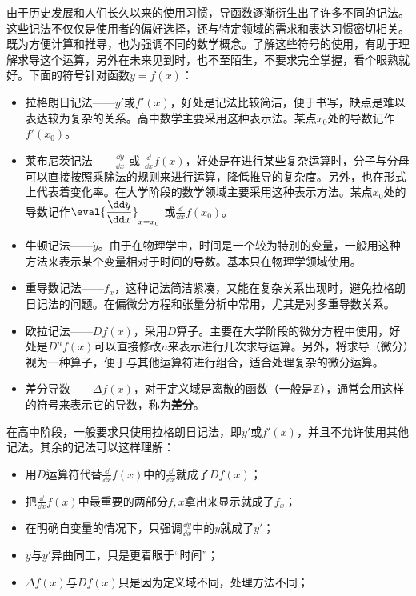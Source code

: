 由于历史发展和人们长久以来的使用习惯，导函数逐渐衍生出了许多不同的记法。这些记法不仅仅是使用者的偏好选择，还与特定领域的需求和表达习惯密切相关。既为方便计算和推导，也为强调不同的数学概念。了解这些符号的使用，有助于理解求导这个运算，另外在未来见到时，也不至陌生，不要求完全掌握，看个眼熟就好。下面的符号针对函数$y=f(x)$：
\begin{itemize}
\item 拉格朗日记法——$y'$或$f'(x)$，好处是记法比较简洁，便于书写，缺点是难以表达较为复杂的关系。高中数学主要采用这种表示法。某点$x_0$处的导数记作$f'(x_0)$。
\item 莱布尼茨记法——$\displaystyle\frac{\dd y}{\dd x}$  或  $\displaystyle\frac{\dd}{\dd x}f(x)$，好处是在进行某些复杂运算时，分子与分母可以直接按照乘除法的规则来进行运算，降低推导的复杂度。另外，也在形式上代表着变化率。在大学阶段的数学领域主要采用这种表示方法。某点$x_0$处的导数记作$\displaystyle\eval{\dfrac{\dd y}{\dd x}}_{x=x_0}$ 或$\displaystyle\frac{\dd}{\dd x}f(x_0)$。
\item 牛顿记法——$\dot{y}$。由于在物理学中，时间是一个较为特别的变量，一般用这种方法来表示某个变量相对于时间的导数。基本只在物理学领域使用。
\item 重导数记法——$f_x$，这种记法简洁紧凑，又能在复杂关系出现时，避免拉格朗日记法的问题。在偏微分方程和张量分析中常用，尤其是对多重导数关系。
\item 欧拉记法——$Df(x)$，采用$D$算子。主要在大学阶段的微分方程中使用，好处是$D^n f(x)$可以直接修改$n$来表示进行几次求导运算。另外，将求导（微分）视为一种算子，便于与其他运算符进行组合，适合处理复杂的微分运算。
\item 差分导数——$\Delta f(x)$，对于定义域是离散的函数（一般是$\mathbb{Z}$），通常会用这样的符号来表示它的导数，称为\textbf{差分}。
\end{itemize}

在高中阶段，一般要求只使用拉格朗日记法，即$y'$或$f'(x)$，并且不允许使用其他记法。其余的记法可以这样理解：
\begin{itemize}
\item 用$D$运算符代替$\displaystyle\frac{\dd}{\dd x}f(x)$中的$\displaystyle\frac{\dd}{\dd x}$就成了$Df(x)$；
\item 把$\displaystyle\frac{\dd}{\dd x}f(x)$中最重要的两部分$f,x$拿出来显示就成了$f_x$；
\item 在明确自变量的情况下，只强调$\displaystyle\frac{\dd y}{\dd x}$中的$y$就成了$y'$；
\item $\dot{y}$与$y'$异曲同工，只是更着眼于“时间”；
\item $\Delta f(x)$与$Df(x)$只是因为定义域不同，处理方法不同；
\end{itemize}

